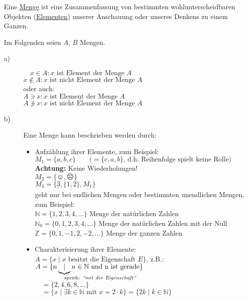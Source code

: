 \documentclass[a4paper, 12pt, twoside] {article}
\begin{document}
Eine \underline{Menge} ist eine Zusammenfassung von bestimmten wohlunterscheidbaren Objekten (\underline{Elementen}) unserer Anschauung oder unseres Denkens zu einem Ganzen.

Im Folgenden seien $A$, $B$ Mengen.

\begin{description}
\item[a)] 
	$\quad x \in A : x \text{ ist Element der Menge } A$ \\
	$x \notin A: x \text{ ist nicht Element der Menge } A$ \\
	oder auch: \\
	$A \ni x : x \text{ ist Element der Menge } A$ \\
	$A \not \ni x: x \text{ ist nicht Element der Menge } A$
\item[b)]
	Eine Menge kann beschrieben werden durch:
	\begin{itemize}
		\item Aufzählung ihrer Elemente, zum Beispiel: \\
		$M_1 = \{a,b,c\} \qquad \text{(}=\{c,a,b\} \text{, d.h. Reihenfolge spielt keine Rolle)}$ \\
		\textbf{Achtung:} Keine Wiederholungen! \\
		$M_2 = \{\smiley,\frownie\}$ \\
		$M_3 = \{ \underline{3}, \underline{\{1,2\}}, \underline{M_1}\}$ \\
		geht nur bei endlichen Mengen oder bestimmten unendlichen Mengen, zum Beispiel: \\
		$\mathbb{N} = \{1,2,3,4,...\}$ Menge der natürlichen Zahlen \\
		$\mathbb{N}_0 = \{0, 1,2,3,4,...\}$ Menge der natürlichen Zahlen mit der Null \\
		$\mathbb{Z} = \{0,1,-1,2,-2,...\}$ Menge der ganzen Zahlen
		\item Charakterisierung ihrer Elemente: \\
		$A = \{x \mid x \text{ besitzt die Eigenschaft } E\}$, z.B.:\\
		$A = \{n \underbrace{\mid}_{\mathrlap{\text{sprich: \textit{''mit der Eigenschaft''}}}} n \in \mathbb{N} \text{ und n ist gerade}\}$\\
		$\quad = \{2,4,6,8,...\}$ \\
		$\quad = \{ x \mid \exists k \in \mathbb{N} \text{ mit } x = 2 \cdot k\} = \{2k \mid k \in \mathbb{N}\}$ \\
		

\end{itemize}
\end{description}
\end{document}
